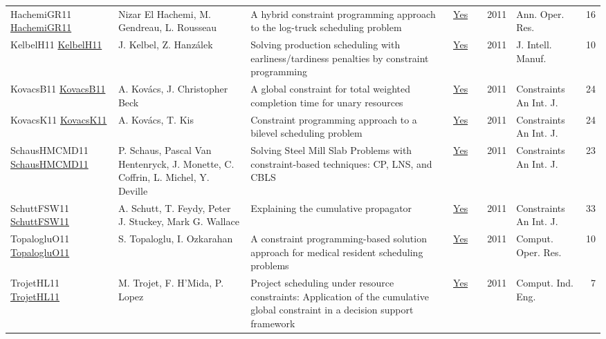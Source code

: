 {\begin{longtable}{p{3cm}p{6cm}p{7cm}rrrp{3cm}r}
HachemiGR11 \href{https://doi.org/10.1007/s10479-010-0698-x}{HachemiGR11} & Nizar El Hachemi, M. Gendreau, L. Rousseau & A hybrid constraint programming approach to the log-truck scheduling problem & \href{articles/HachemiGR11.pdf}{Yes} & \cite{HachemiGR11} & 2011 & Ann. Oper. Res. & 16\\
KelbelH11 \href{https://doi.org/10.1007/s10845-009-0318-2}{KelbelH11} & J. Kelbel, Z. Hanz{\'{a}}lek & Solving production scheduling with earliness/tardiness penalties by constraint programming & \href{articles/KelbelH11.pdf}{Yes} & \cite{KelbelH11} & 2011 & J. Intell. Manuf. & 10\\
KovacsB11 \href{https://doi.org/10.1007/s10601-009-9088-x}{KovacsB11} & A. Kov{\'{a}}cs, J. Christopher Beck & A global constraint for total weighted completion time for unary resources & \href{articles/KovacsB11.pdf}{Yes} & \cite{KovacsB11} & 2011 & Constraints An Int. J. & 24\\
KovacsK11 \href{https://doi.org/10.1007/s10601-010-9102-3}{KovacsK11} & A. Kov{\'{a}}cs, T. Kis & Constraint programming approach to a bilevel scheduling problem & \href{articles/KovacsK11.pdf}{Yes} & \cite{KovacsK11} & 2011 & Constraints An Int. J. & 24\\
SchausHMCMD11 \href{https://doi.org/10.1007/s10601-010-9100-5}{SchausHMCMD11} & P. Schaus, Pascal Van Hentenryck, J. Monette, C. Coffrin, L. Michel, Y. Deville & Solving Steel Mill Slab Problems with constraint-based techniques: CP, LNS, and {CBLS} & \href{articles/SchausHMCMD11.pdf}{Yes} & \cite{SchausHMCMD11} & 2011 & Constraints An Int. J. & 23\\
SchuttFSW11 \href{https://doi.org/10.1007/s10601-010-9103-2}{SchuttFSW11} & A. Schutt, T. Feydy, Peter J. Stuckey, Mark G. Wallace & Explaining the cumulative propagator & \href{articles/SchuttFSW11.pdf}{Yes} & \cite{SchuttFSW11} & 2011 & Constraints An Int. J. & 33\\
TopalogluO11 \href{https://doi.org/10.1016/j.cor.2010.04.018}{TopalogluO11} & S. Topaloglu, I. Ozkarahan & A constraint programming-based solution approach for medical resident scheduling problems & \href{articles/TopalogluO11.pdf}{Yes} & \cite{TopalogluO11} & 2011 & Comput. Oper. Res. & 10\\
TrojetHL11 \href{https://doi.org/10.1016/j.cie.2010.08.014}{TrojetHL11} & M. Trojet, F. H'Mida, P. Lopez & Project scheduling under resource constraints: Application of the cumulative global constraint in a decision support framework & \href{articles/TrojetHL11.pdf}{Yes} & \cite{TrojetHL11} & 2011 & Comput. Ind. Eng. & 7\\

\end{longtable}}
